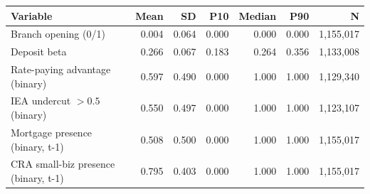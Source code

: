 \begin{tabular}{lrrrrrr}
\toprule
Variable & Mean & SD & P10 & Median & P90 & N \\
\midrule
Branch opening (0/1) & 0.004 & 0.064 & 0.000 & 0.000 & 0.000 & 1,155,017 \\
Deposit beta & 0.266 & 0.067 & 0.183 & 0.264 & 0.356 & 1,133,008 \\
Rate-paying advantage (binary) & 0.597 & 0.490 & 0.000 & 1.000 & 1.000 & 1,129,340 \\
IEA undercut $> 0.5$ (binary) & 0.550 & 0.497 & 0.000 & 1.000 & 1.000 & 1,123,107 \\
Mortgage presence (binary, t-1) & 0.508 & 0.500 & 0.000 & 1.000 & 1.000 & 1,155,017 \\
CRA small-biz presence (binary, t-1) & 0.795 & 0.403 & 0.000 & 1.000 & 1.000 & 1,155,017 \\
\bottomrule
\end{tabular}

